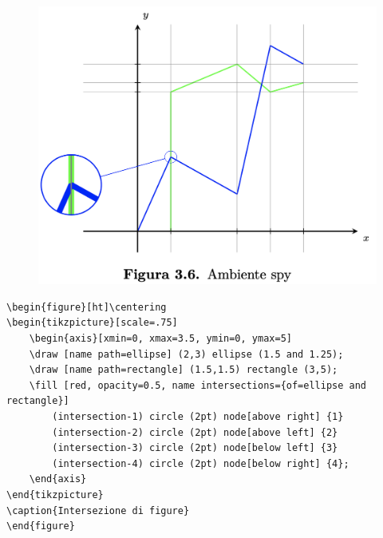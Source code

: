 \begin{figure}[ht]\centering
\includegraphics[scale=.5]{FileAusiliari/Screenshots/Figura3-6.png}
\end{figure}

\newpage
\begin{verbatim}
\begin{figure}[ht]\centering
\begin{tikzpicture}[scale=.75]
	\begin{axis}[xmin=0, xmax=3.5, ymin=0, ymax=5]
	\draw [name path=ellipse] (2,3) ellipse (1.5 and 1.25);
	\draw [name path=rectangle] (1.5,1.5) rectangle (3,5);
	\fill [red, opacity=0.5, name intersections={of=ellipse and rectangle}]   
		(intersection-1) circle (2pt) node[above right] {1}
        (intersection-2) circle (2pt) node[above left] {2} 
        (intersection-3) circle (2pt) node[below left] {3} 
        (intersection-4) circle (2pt) node[below right] {4};
	\end{axis}
\end{tikzpicture}
\caption{Intersezione di figure}
\end{figure}
\end{verbatim}

